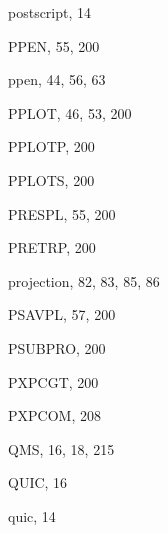 \begin{theindex}
  \item postscript, 14
  \item PPEN, 55, 200
  \item ppen, 44, 56, 63
  \item PPLOT, 46, 53, 200
  \item PPLOTP, 200
  \item PPLOTS, 200
  \item PRESPL, 55, 200
  \item PRETRP, 200
  \item projection, 82, 83, 85, 86
  \item PSAVPL, 57, 200
  \item PSUBPRO, 200
  \item PXPCGT, 200
  \item PXPCOM, 208

  \indexspace

  \item QMS, 16, 18, 215
  \item QUIC, 16
  \item quic, 14

  \indexspace


\end{theindex}
